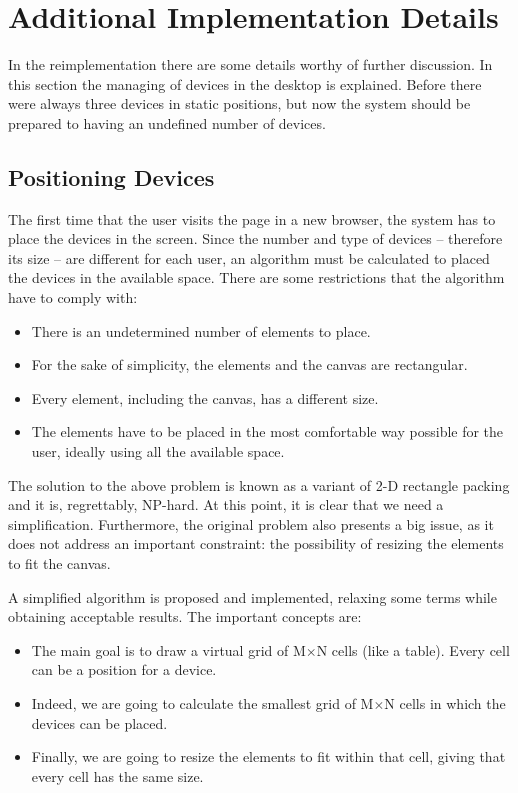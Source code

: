 \section{Additional Implementation Details} %
\label{sec:positioning}

In the  reimplementation there are some details worthy of further discussion.
In this section the managing of devices in the desktop is explained.
Before there were always three devices in static positions, but now the system should be prepared to having an undefined number of devices.

\subsection{Positioning Devices} %
\label{sub:algorithm}

The first time that the user visits the page in a new browser, the system has to place the devices in the screen.
Since the number and type of devices -- therefore its size -- are different for each user, an algorithm must be calculated to placed the devices in the available space.
There are some restrictions that the algorithm have to comply with:

\begin{itemize}
  \item There is an undetermined number of elements to place.
  \item For the sake of simplicity, the elements and the canvas are rectangular.
  \item Every element, including the canvas, has a different size.
  \item The elements have to be placed in the most comfortable way possible for the user, ideally using all the available space.
\end{itemize}

The solution to the above problem is known as a variant of 2-D rectangle packing and it is, regrettably, NP-hard.
At this point, it is clear that we need a simplification.
Furthermore, the original problem also presents a big issue, as it does not address an important constraint: the possibility of resizing the elements to fit the canvas.

A simplified algorithm is proposed and implemented, relaxing some terms while obtaining acceptable results.
The important concepts are:

\begin{itemize}
  \item The main goal is to draw a virtual grid of M$\times$N cells (like a table).
  Every cell can be a position for a device.
  \item Indeed, we are going to calculate the smallest grid of M$\times$N cells in which the devices can be placed.
  \item Finally, we are going to resize the elements to fit within that cell, giving that every cell has the same size.

\end{itemize}

